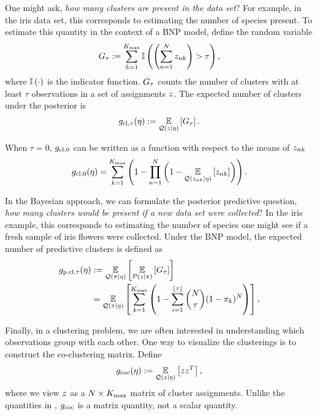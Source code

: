 \begin{ex}

One might ask, \textit{how many clusters are present in the data set}?
For example, in the iris data set, this corresponds to estimating the number of
species present.
To estimate this quantity in the context of a BNP model, define the random variable
\begin{align*}
  G_\tau := \sum_{k=1}^{K_{\mathrm{max}}} \mathbb{I}\left( \left(\sum_{n=1}^{N}
  z_{nk}\right) > \tau\right),
\end{align*}
where $\mathbb{I}\left(\cdot\right)$ is the indicator function.
$G_\tau$ counts the number of clusters with at least $\tau$
observations in a set of assignments $z$.
The expected number of clusters under the posterior is
\begin{align*}
  g_{\text{cl},\tau}(\eta) := \underset{\mathcal{Q}(z\vert\eta)}{\mathbb{E}}\left[G_\tau\right].
\end{align*}

When $\tau = 0$, $g_{\text{cl},0}$ can be written as a function with respect to
the means of $z_{nk}$
\begin{align*}
  g_{\text{cl},0}(\eta) = \sum_{k=1}^{K_{\mathrm{max}}} \left(1 -  \prod_{n=1}^N
  \left(1 - \underset{\mathcal{Q}(z_{nk}\vert\eta)}{\mathbb{E}}\left[z_{nk}\right]\right)\right).
\end{align*}
%
\end{ex}

\begin{ex}

In the Bayesian approach, we can formulate the posterior predictive question,
\textit{how many clusters would be present if a new data set were collected}?
In the iris example, this corresponds to estimating the number of species
one might see if a fresh sample of iris flowers were collected.
Under the BNP model, the expected number of predictive clusters is defined as
\begin{align*}
  g_{\text{p.cl},\tau}(\eta) &:= \underset{\mathcal{Q}(\pi\vert\eta)}{\mathbb{E}}\left[\underset{\mathcal{P}(z\vert\pi)}{\mathbb{E}}\left[G_\tau\right]\right]\\
  &= \underset{\mathcal{Q}(\pi\vert\eta)}{\mathbb{E}}\left[\sum_{k=1}^{K_{\mathrm{max}}}\left(1 -
  \sum_{i=1}^{\lfloor\tau\rfloor} {N \choose \tau} (1 - \pi_k)^N \right)\right],
\end{align*}
\end{ex}

\begin{ex}[Co-clustering]

Finally, in a clustering problem, we are often interested in understanding
which observations group with each other.
One way to visualize the clusterings is to construct the co-clustering matrix.
Define
\begin{align*}
g_{\text{coc}}(\eta) := \underset{\mathcal{Q}(z\vert\eta)}{\mathbb{E}}\left[zz^{T}\right],
\end{align*}
where we view $z$ as a $N\times {K_{\mathrm{max}}}$ matrix of cluster assignments.
Unlike the quantities in ,
$g_{\text{coc}}$ is a matrix quantity, not a scalar quantity.

\end{ex}

